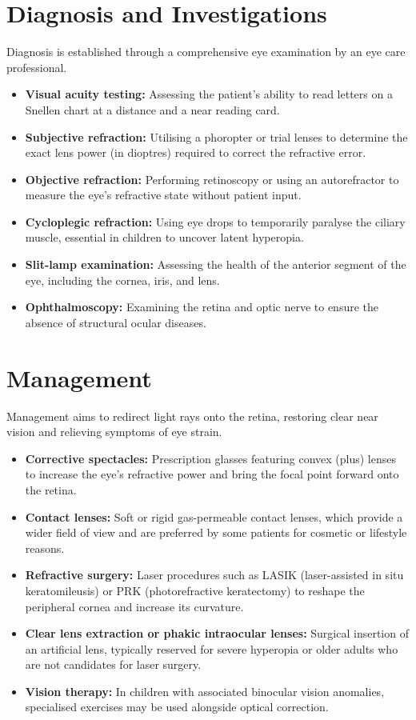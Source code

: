 \section*{Diagnosis and Investigations}
Diagnosis is established through a comprehensive eye examination by an eye care professional.
\begin{itemize}
    \item \textbf{Visual acuity testing:} Assessing the patient's ability to read letters on a Snellen chart at a distance and a near reading card.
    \item \textbf{Subjective refraction:} Utilising a phoropter or trial lenses to determine the exact lens power (in dioptres) required to correct the refractive error.
    \item \textbf{Objective refraction:} Performing retinoscopy or using an autorefractor to measure the eye's refractive state without patient input.
    \item \textbf{Cycloplegic refraction:} Using eye drops to temporarily paralyse the ciliary muscle, essential in children to uncover latent hyperopia.
    \item \textbf{Slit-lamp examination:} Assessing the health of the anterior segment of the eye, including the cornea, iris, and lens.
    \item \textbf{Ophthalmoscopy:} Examining the retina and optic nerve to ensure the absence of structural ocular diseases.
\end{itemize}

\section*{Management}
Management aims to redirect light rays onto the retina, restoring clear near vision and relieving symptoms of eye strain.
\begin{itemize}
    \item \textbf{Corrective spectacles:} Prescription glasses featuring convex (plus) lenses to increase the eye's refractive power and bring the focal point forward onto the retina.
    \item \textbf{Contact lenses:} Soft or rigid gas-permeable contact lenses, which provide a wider field of view and are preferred by some patients for cosmetic or lifestyle reasons.
    \item \textbf{Refractive surgery:} Laser procedures such as LASIK (laser-assisted in situ keratomileusis) or PRK (photorefractive keratectomy) to reshape the peripheral cornea and increase its curvature.
    \item \textbf{Clear lens extraction or phakic intraocular lenses:} Surgical insertion of an artificial lens, typically reserved for severe hyperopia or older adults who are not candidates for laser surgery.
    \item \textbf{Vision therapy:} In children with associated binocular vision anomalies, specialised exercises may be used alongside optical correction.
\end{itemize}

